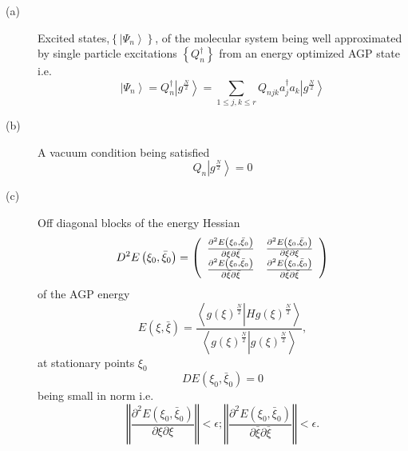 \documentclass[aps,preprint]{revtex4}%
\begin{document}
\begin{description}
\item[(a)] Excited states,$\left\{  \left\vert \Psi_{n}\right\rangle \right\}
$, of the molecular system being well approximated by single particle
excitations $\left\{  Q_{n}^{\dagger}\right\}  $ from an energy optimized AGP
state i.e.%
\begin{equation}
\left\vert \Psi_{n}\right\rangle =Q_{n}^{\dagger}\left\vert g^{\frac{N}{2}%
}\right\rangle =\sum_{1\leq j,k\leq r}Q_{njk}a_{j}^{\dagger}a_{k}\left\vert
g^{\frac{N}{2}}\right\rangle
\end{equation}


\item[(b)] A vacuum condition being satisfied%
\begin{equation}
Q_{n}\left\vert g^{\frac{N}{2}}\right\rangle =0\label{Killer}%
\end{equation}


\item[(c)] Off diagonal blocks of the energy Hessian
\begin{equation}
D^{2}E\left(  \xi_{0},\bar{\xi}_{0}\right)  =\left(
\begin{array}
[c]{cc}%
\frac{\partial^{2}E\left(  \xi_{0},\bar{\xi}_{0}\right)  }{\partial\xi
\partial\bar{\xi}} & \frac{\partial^{2}E\left(  \xi_{0},\bar{\xi}_{0}\right)
}{\partial\xi\partial\xi}\\
\frac{\partial^{2}E\left(  \xi_{0},\bar{\xi}_{0}\right)  }{\partial\bar{\xi
}\partial\bar{\xi}} & \frac{\partial^{2}E\left(  \xi_{0},\bar{\xi}_{0}\right)
}{\partial\bar{\xi}\partial\bar{\xi}}%
\end{array}
\right)  \label{Hess}%
\end{equation}
of the AGP energy
\begin{equation}
E\left(  \xi,\bar{\xi}\right)  =\frac{\left\langle \left.  g\left(
\xi\right)  ^{\frac{N}{2}}\right\vert Hg\left(  \xi\right)  ^{\frac{N}{2}%
}\right\rangle }{\left\langle \left.  g\left(  \xi\right)  ^{\frac{N}{2}%
}\right\vert g\left(  \xi\right)  ^{\frac{N}{2}}\right\rangle },\label{Energy}%
\end{equation}
at stationary points $\xi_{0}$
\begin{equation}
DE\left(  \xi_{0},\bar{\xi}_{0}\right)  =0
\end{equation}
being small in norm i.e.%
\begin{equation}
\left\Vert \frac{\partial^{2}E\left(  \xi_{0},\bar{\xi}_{0}\right)  }%
{\partial\xi\partial\xi}\right\Vert <\epsilon;\left\Vert \frac{\partial
^{2}E\left(  \xi_{0},\bar{\xi}_{0}\right)  }{\partial\bar{\xi}\partial\bar
{\xi}}\right\Vert <\epsilon.
\end{equation}

\end{description}
\end{document}
